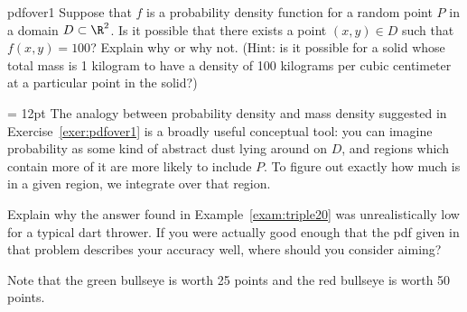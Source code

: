 \documentclass{watsonbook}
\begin{document}
\begin{exercise}{}{pdfover1}
  Suppose that $f$ is a probability density function for a random
  point $P$ in a domain $D\subset \R^2$. Is it possible that there
  exists a point $(x,y) \in D$ such that $f(x,y) = 100$? Explain why
  or why not. (Hint: is it possible for a solid whose total mass is 1
  kilogram to have a density of 100 kilograms per cubic centimeter at
  a particular point in the solid?)
\end{exercise}

\begin{minipage}[t]{0.55\textwidth} \parskip = 12pt 
  The analogy between probability density and mass density suggested
  in Exercise~\ref{exer:pdfover1} is a broadly useful conceptual tool:
  you can imagine probability as some kind of abstract dust lying around
  on $D$, and regions which contain more of it are more likely to
  include $P$. To figure out exactly how much is in a given region, we
  integrate over that region. 

  \begin{exercise}{}{}
    Explain why the answer found in Example~\ref{exam:triple20} was
    unrealistically low for a typical dart thrower. If you were
    actually good enough that the pdf given in that problem describes
    your accuracy well, where should you consider aiming?

    Note that the green bullseye is worth 25 points and the red
    bullseye is worth 50 points.
  \end{exercise}
\end{minipage} \hfill
\end{document}
